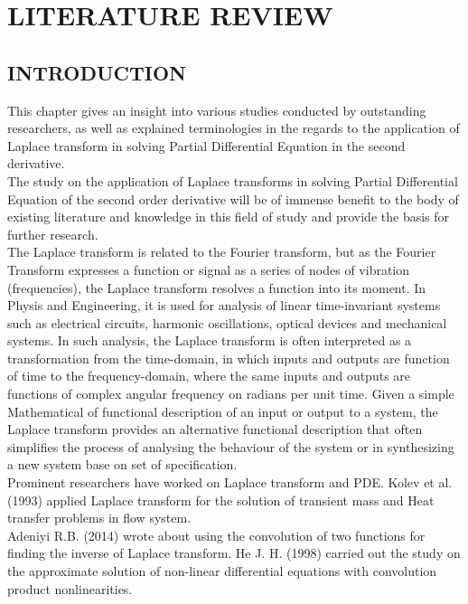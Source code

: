\documentclass[11pt]{report}
\newcommand{\NI}{\noindent}
\newcommand{\PDe}{Partial Differential Equation }
\begin{document}
	
	\chapter{LITERATURE REVIEW}
	\section{INTRODUCTION}
	This chapter gives an insight into various studies conducted by outstanding researchers, as well as explained terminologies in the regards to the application of Laplace transform in solving \PDe in the second derivative.\\
	
	\NI The study on the application of Laplace transforms in solving Partial Differential Equation of the second order derivative will be of immense benefit to the body of existing literature and knowledge in this field of study and provide the basis for further research.\\
	
	\NI The Laplace transform is related to the Fourier transform, but as the Fourier Transform expresses a function or signal as a series of nodes of vibration (frequencies), the Laplace transform resolves a function into its moment. In Physis and Engineering, it is used for analysis of linear time-invariant systems such as electrical circuits, harmonic oscillations, optical devices and mechanical systems. In such analysis, the Laplace transform is often interpreted as a transformation from the time-domain, in which inputs and outputs are function of time to the frequency-domain, where the same inputs and outputs are functions of complex angular frequency on radians per unit time. Given a simple Mathematical of functional description of an input or output to a system, the Laplace transform provides an alternative functional description that often simplifies the process of analysing the behaviour of the system or in synthesizing a new system base on set of specification.\\
	
	\NI Prominent researchers have worked on Laplace transform and PDE. Kolev et al. (1993) applied Laplace transform for the solution of transient mass and Heat transfer problems in flow system.\\
	
	\NI Adeniyi R.B. (2014) wrote about using the convolution of two functions for finding the inverse of Laplace transform.
	He J. H. (1998) carried out the study on the approximate solution of non-linear differential equations with convolution product nonlinearities. 
	
\end{document}
